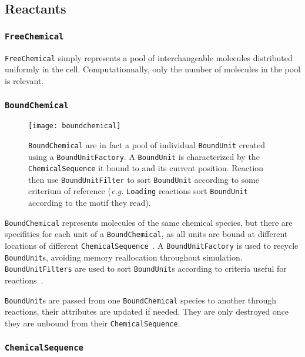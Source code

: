
\subsection{Reactants}

\subsubsection{\texttt{FreeChemical}}

\texttt{FreeChemical} simply represents a pool of interchangeable molecules distributed uniformly in the cell. Computationnally, only the number of molecules in the pool is relevant.

\subsubsection{\texttt{BoundChemical}}

\begin{figure}[!h]
  \centering
  \texttt{[image: boundchemical]}
  \caption{\texttt{BoundChemical} are in fact a pool of individual \texttt{BoundUnit} created using a \texttt{BoundUnitFactory}. A \texttt{BoundUnit} is characterized by the \texttt{ChemicalSequence} it bound to and its current position. Reaction then use \texttt{BoundUnitFilter} to sort \texttt{BoundUnit} according to some criterium of reference (\textit{e.g.} \texttt{Loading} reactions sort \texttt{BoundUnit} according to the motif they read).}
  \label{fig:det_bound_chemical}
\end{figure}

\texttt{BoundChemical} represents molecules of the same chemical species, but there are specifities for each unit of a \texttt{BoundChemical}, as all units are bound at different locations of different \texttt{ChemicalSequence}~. A \texttt{BoundUnitFactory} is used to recycle \texttt{BoundUnit}s, avoiding memory reallocation throughout simulation. \texttt{BoundUnitFilters} are used to sort \texttt{BoundUnit}s according to criteria useful for reactions~.


\texttt{BoundUnit}s are passed from one \texttt{BoundChemical} species to another through reactions, their attributes are updated if needed. They are only destroyed once they are unbound from their \texttt{ChemicalSequence}.

\subsubsection{\texttt{ChemicalSequence}}


